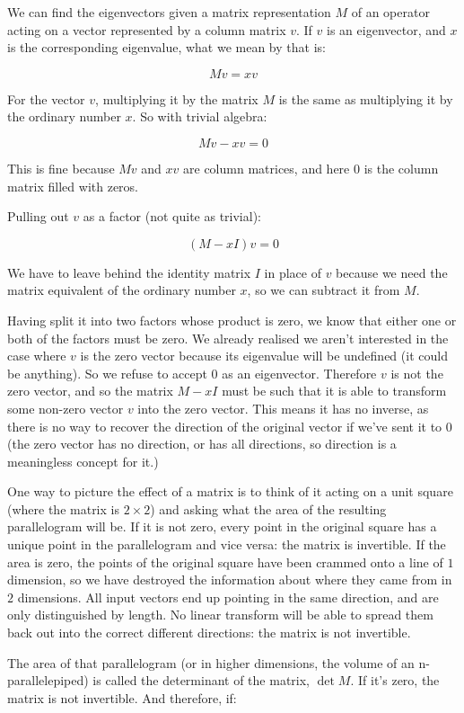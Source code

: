 We can find the eigenvectors given a matrix representation $M$ of an operator acting on a vector represented by a column matrix $v$. If $v$ is an eigenvector, and $x$ is the corresponding eigenvalue, what we mean by that is:

$$Mv = xv$$

For the vector $v$, multiplying it by the matrix $M$ is the same as multiplying it by the ordinary number $x$. So with trivial algebra:

$$Mv - xv = 0$$

This is fine because $Mv$ and $xv$ are column matrices, and here $0$ is the column matrix filled with zeros.

Pulling out $v$ as a factor (not quite as trivial):

$$(M - xI)v = 0$$

We have to leave behind the identity matrix $I$ in place of $v$ because we need the matrix equivalent of the ordinary number $x$, so we can subtract it from $M$.

Having split it into two factors whose product is zero, we know that either one or both of the factors must be zero. We already realised we aren't interested in the case where $v$ is the zero vector because its eigenvalue will be undefined (it could be anything). So we refuse to accept $0$ as an eigenvector. Therefore $v$ is not the zero vector, and so the matrix $M - xI$ must be such that it is able to transform some non-zero vector $v$ into the zero vector. This means it has no inverse, as there is no way to recover the direction of the original vector if we've sent it to $0$ (the zero vector has no direction, or has all directions, so direction is a meaningless concept for it.)

One way to picture the effect of a matrix is to think of it acting on a unit square (where the matrix is $2 \times 2$) and asking what the area of the resulting parallelogram will be. If it is not zero, every point in the original square has a unique point in the parallelogram and vice versa: the matrix is invertible. If the area is zero, the points of the original square have been crammed onto a line of $1$ dimension, so we have destroyed the information about where they came from in $2$ dimensions. All input vectors end up pointing in the same direction, and are only distinguished by length. No linear transform will be able to spread them back out into the correct different directions: the matrix is not invertible.

The area of that parallelogram (or in higher dimensions, the volume of an n-parallelepiped) is called the determinant of the matrix, $\det M$. If it's zero, the matrix is not invertible. And therefore, if:

